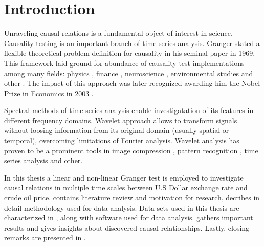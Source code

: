 \section{Introduction}

Unraveling causal relations is a fundamental object of interest in science.
Causality testing is an important branch of time series analysis.
Granger \cite{granger69} stated a flexible theoretical problem definition for causality in his seminal paper in 1969.
This framework laid ground for abundance of causality test implementations among many fields:
physics \cite{inverse-ising,coupled-oscillators},
finance \cite{hiemstra-jones, gold-stock},
neuroscience \cite{Bullmore2009,causality-eeg,causality-visual},
environmental studies \cite{dogan2016co,ecological-economics}
and other \cite{social-media}.
The impact of this approach was later recognized awarding him the Nobel Prize in Economics in 2003 \cite{nobel2003}.

Spectral methods of time series analysis enable investigatation of its features in different frequency domains.
Wavelet approach allows to transform signals without loosing information from its original domain (usually spatial or temporal), overcoming limitations of Fourier analysis.
Wavelet analysis has proven to be a prominent tools in image compression \cite{jpeg2000}, 
pattern recognition \cite{pattern-recognition}, 
time series analysis \cite{multifractal-time-series} 
and other. %

In this thesis a linear and non-linear Granger test is employed to investigate causal relations
in multiple time scales between U.S Dollar exchange rate and crude oil price.
 contains literature review and motivation for research,
 decribes in detail methodology used for data analysis.
Data sets used in this thesis are characterized in , along with software used for data analysis.
 gathers important results and gives insights about discovered causal relationships.
Lastly, closing remarks are presented in .
